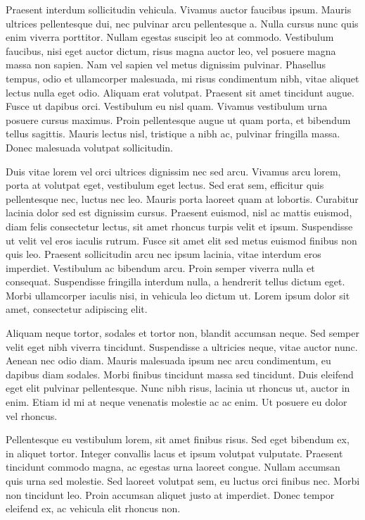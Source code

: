 \documentclass[a4paper,10pt,twoside]{article} %
\begin{document}
Praesent interdum sollicitudin vehicula.
Vivamus auctor faucibus ipsum.
Mauris ultrices pellentesque dui, nec pulvinar arcu pellentesque a.
Nulla cursus nunc quis enim viverra porttitor.
Nullam egestas suscipit leo at commodo.
Vestibulum faucibus, nisi eget auctor dictum, risus magna auctor leo, vel posuere magna massa non sapien.
Nam vel sapien vel metus dignissim pulvinar.
Phasellus tempus, odio et ullamcorper malesuada, mi risus condimentum nibh, vitae aliquet lectus nulla eget odio.
Aliquam erat volutpat.
Praesent sit amet tincidunt augue.
Fusce ut dapibus orci.
Vestibulum eu nisl quam.
Vivamus vestibulum urna posuere cursus maximus.
Proin pellentesque augue ut quam porta, et bibendum tellus sagittis.
Mauris lectus nisl, tristique a nibh ac, pulvinar fringilla massa.
Donec malesuada volutpat sollicitudin.

Duis vitae lorem vel orci ultrices dignissim nec sed arcu.
Vivamus arcu lorem, porta at volutpat eget, vestibulum eget lectus.
Sed erat sem, efficitur quis pellentesque nec, luctus nec leo.
Mauris porta laoreet quam at lobortis.
Curabitur lacinia dolor sed est dignissim cursus.
Praesent euismod, nisl ac mattis euismod, diam felis consectetur lectus, sit amet rhoncus turpis velit et ipsum.
Suspendisse ut velit vel eros iaculis rutrum.
Fusce sit amet elit sed metus euismod finibus non quis leo.
Praesent sollicitudin arcu nec ipsum lacinia, vitae interdum eros imperdiet.
Vestibulum ac bibendum arcu.
Proin semper viverra nulla et consequat.
Suspendisse fringilla interdum nulla, a hendrerit tellus dictum eget.
Morbi ullamcorper iaculis nisi, in vehicula leo dictum ut.
Lorem ipsum dolor sit amet, consectetur adipiscing elit.

Aliquam neque tortor, sodales et tortor non, blandit accumsan neque.
Sed semper velit eget nibh viverra tincidunt.
Suspendisse a ultricies neque, vitae auctor nunc.
Aenean nec odio diam.
Mauris malesuada ipsum nec arcu condimentum, eu dapibus diam sodales.
Morbi finibus tincidunt massa sed tincidunt.
Duis eleifend eget elit pulvinar pellentesque.
Nunc nibh risus, lacinia ut rhoncus ut, auctor in enim.
Etiam id mi at neque venenatis molestie ac ac enim.
Ut posuere eu dolor vel rhoncus.

Pellentesque eu vestibulum lorem, sit amet finibus risus.
Sed eget bibendum ex, in aliquet tortor.
Integer convallis lacus et ipsum volutpat vulputate.
Praesent tincidunt commodo magna, ac egestas urna laoreet congue.
Nullam accumsan quis urna sed molestie.
Sed laoreet volutpat sem, eu luctus orci finibus nec.
Morbi non tincidunt leo.
Proin accumsan aliquet justo at imperdiet.
Donec tempor eleifend ex, ac vehicula elit rhoncus non.
\end{document}
